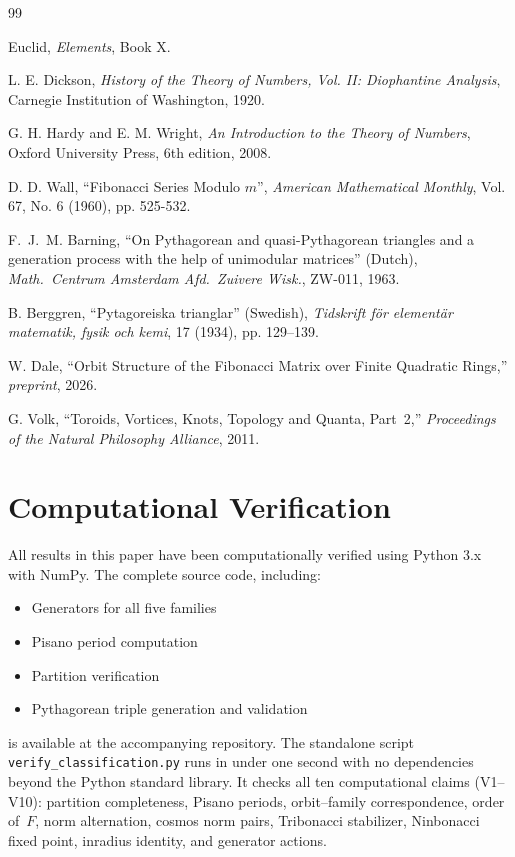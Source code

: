 \documentclass[12pt]{article}
\begin{document}
\begin{thebibliography}{99}

Euclid, \emph{Elements}, Book X.

L. E. Dickson, \emph{History of the Theory of Numbers, Vol. II: Diophantine Analysis}, Carnegie Institution of Washington, 1920.

G. H. Hardy and E. M. Wright, \emph{An Introduction to the Theory of Numbers}, Oxford University Press, 6th edition, 2008.

D. D. Wall, ``Fibonacci Series Modulo $m$'', \emph{American Mathematical Monthly}, Vol. 67, No. 6 (1960), pp. 525-532.

F.~J.~M. Barning, ``On Pythagorean and quasi-Pythagorean triangles and a generation process with the help of unimodular matrices'' (Dutch), \emph{Math.\ Centrum Amsterdam Afd.\ Zuivere Wisk.}, ZW-011, 1963.

B. Berggren, ``Pytagoreiska trianglar'' (Swedish), \emph{Tidskrift f{\"o}r element{\"a}r matematik, fysik och kemi}, 17 (1934), pp. 129--139.

W. Dale, ``Orbit Structure of the Fibonacci Matrix over Finite Quadratic Rings,''
\emph{preprint}, 2026.

G. Volk, ``Toroids, Vortices, Knots, Topology and Quanta, Part~2,''
\emph{Proceedings of the Natural Philosophy Alliance}, 2011.

\end{thebibliography}

\appendix

\section{Computational Verification}

All results in this paper have been computationally verified using Python 3.x with NumPy. The complete source code, including:
\begin{itemize}
\item Generators for all five families
\item Pisano period computation
\item Partition verification
\item Pythagorean triple generation and validation
\end{itemize}

is available at the accompanying repository.  The standalone script
\texttt{verify\_classification.py} runs in under one second with no dependencies
beyond the Python standard library.  It checks all ten computational claims
(V1--V10): partition completeness, Pisano periods, orbit--family correspondence,
order of~$F$, norm alternation, cosmos norm pairs, Tribonacci stabilizer,
Ninbonacci fixed point, inradius identity, and generator actions.
\end{document}
